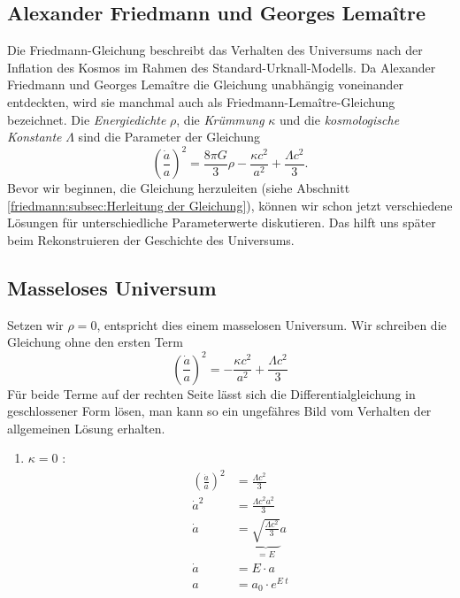 \begin{refsection}
\section{Alexander Friedmann und Georges Lema\^{i}tre}
Die Friedmann-Gleichung beschreibt das Verhalten des Universums nach der Inflation des Kosmos im Rahmen des Standard-Urknall-Modells. Da Alexander Friedmann und Georges Lema\^{i}tre die Gleichung unabhängig voneinander entdeckten, wird sie manchmal auch als Friedmann-Lema\^{i}tre-Gleichung bezeichnet. Die {\em Energiedichte} $\rho$, die {\em Krümmung} $\kappa$ und die {\em kosmologische Konstante} $\Lambda$ sind die Parameter der Gleichung
\begin{equation}
\left(\frac{\dot{a}}{a}\right) ^2 = \frac{8 \pi G}{3} \rho - \frac{\kappa c^2}{a^2} + \frac{\Lambda c^2}{3}.
\end{equation}
Bevor wir beginnen, die Gleichung herzuleiten (siehe Abschnitt \ref{friedmann:subsec:Herleitung der Gleichung}), können wir schon jetzt verschiedene Lösungen für unterschiedliche Parameterwerte diskutieren. Das hilft uns später beim Rekonstruieren der Geschichte des Universums.

\subsection{Masseloses Universum \label{friedmann:masselosesUniversum}}
Setzen wir $\rho = 0$, entspricht dies einem masselosen Universum.  Wir schreiben die Gleichung ohne den ersten Term
\[\left(\frac{\dot{a}}{a}\right) ^2 = - \frac{\kappa c^2}{a^2} + \frac{\Lambda c^2}{3}\]
Für beide Terme auf der rechten Seite lässt sich die Differentialgleichung in geschlossener Form lösen, man kann so ein ungefähres Bild vom Verhalten der allgemeinen Lösung erhalten.
\begin{enumerate}
	\item $\kappa = 0$ :
		\begin{align}
			\nonumber \left(\frac{\dot{a}}{a}\right) ^2 &= \frac{\Lambda c^2}{3} \\
			\nonumber \dot{a} ^2 &= \frac{\Lambda c^2 a^2}{3}  \\
			\nonumber \dot{a} &= \underbrace{\sqrt{\frac{\Lambda c^2}{3}}}_{\displaystyle=E} a \\
			\nonumber \dot{a} &= E \cdot a \\
			a &= a_0 \cdot e^{E \: t} \label{friedmann:Lambda}
		\end{align}
	

\end{enumerate}
\end{refsection}
